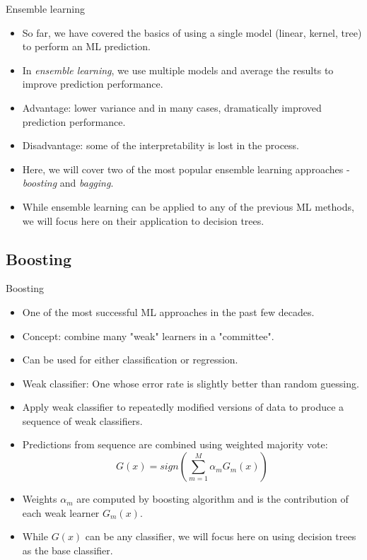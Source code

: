 \documentclass[aspectratio=169]{beamer}
\begin{document}
\begin{frame}{Ensemble learning}
    \begin{itemize}
        \item So far, we have covered the basics of using a single model (linear, kernel, tree) to perform an ML prediction.
        \item In \textit{ensemble learning}, we use multiple models and average the results to improve prediction performance.
        \item Advantage: lower variance and in many cases, dramatically improved prediction performance.
        \item Disadvantage: some of the interpretability is lost in the process.
        \item Here, we will cover two of the most popular ensemble learning approaches - \textit{boosting} and \textit{bagging}.
        \item While ensemble learning can be applied to any of the previous ML methods, we will focus here on their application to decision trees.
    \end{itemize}
\end{frame}


\subsection{Boosting}


\begin{frame}{Boosting}
    \begin{itemize}
        \item One of the most successful ML approaches in the past few decades.
        \item Concept: combine many "weak" learners in a "committee".
        \item Can be used for either classification or regression.
        \item Weak classifier: One whose error rate is slightly better than random guessing.
        \item Apply weak classifier to repeatedly modified versions of data to produce a sequence of weak classifiers.
        \item Predictions from sequence are combined using weighted majority vote:
        \begin{equation*}
            G(x) = sign\left( \sum_{m=1}^M \alpha_mG_m(x)\right)
        \end{equation*}
        \item Weights $\alpha_m$ are computed by boosting algorithm and is the contribution of each weak learner $G_m(x)$.
        \item While $G(x)$ can be any classifier, we will focus here on using decision trees as the base classifier.
    \end{itemize}
\end{frame}
\end{document}
